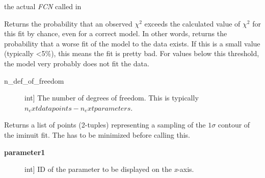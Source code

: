 \documentclass[a4paper,10pt,english]{sphinxmanual}
\begin{document}
\begin{fulllineitems}
\begin{fulllineitems}
\begin{description}
\end{description}

\end{fulllineitems}


\begin{fulllineitems}
\label{module_doc:kafe.iminuit_wrapper.IMinuit.function_to_minimize}
the actual \emph{FCN} called in 

\end{fulllineitems}


\begin{fulllineitems}
\label{module_doc:kafe.iminuit_wrapper.IMinuit.get_chi2_probability}
Returns the probability that an observed \(\chi^2\) exceeds
the calculated value of \(\chi^2\) for this fit by chance,
even for a correct model. In other words, returns the probability that
a worse fit of the model to the data exists. If this is a small value
(typically \textless{}5\%), this means the fit is pretty bad. For values below
this threshold, the model very probably does not fit the data.
\begin{description}
\item[{n\_def\_of\_freedom}] \leavevmode{[}int{]}
The number of degrees of freedom. This is typically
\(n_   ext{datapoints} - n_    ext{parameters}\).

\end{description}

\end{fulllineitems}


\begin{fulllineitems}
\label{module_doc:kafe.iminuit_wrapper.IMinuit.get_contour}
Returns a list of points (2-tuples) representing a sampling of
the \(1\sigma\) contour of the iminuit fit. The  has
to be minimized before calling this.
\begin{description}
\item[{\textbf{parameter1}}] \leavevmode{[}int{]}
ID of the parameter to be displayed on the \emph{x}-axis.


\end{description}
\end{fulllineitems}
\end{fulllineitems}
\end{document}
